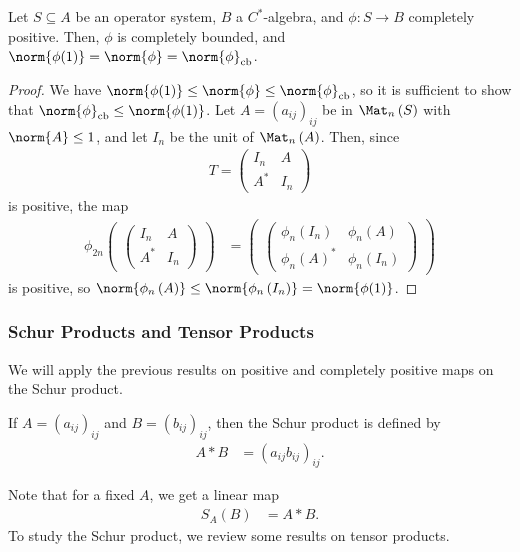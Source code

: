 \documentclass[10pt]{mypackage}
\DeclareMathOperator{\cb}{cb}
\begin{document}
\begin{proposition}
  Let $S\subseteq A$ be an operator system, $B$ a $C^{\ast}$-algebra, and $\phi\colon S\rightarrow B$ completely positive. Then, $\phi$ is completely bounded, and $\norm{\phi(1)} = \norm{\phi} = \norm{\phi}_{\cb}$.
\end{proposition}
\begin{proof}
  We have $\norm{\phi(1)}\leq \norm{\phi}\leq \norm{\phi}_{\cb}$, so it is sufficient to show that $\norm{\phi}_{\cb}\leq \norm{\phi(1)}$. Let $A = \left( a_{ij} \right)_{ij}$ be in $\Mat_n\left( S \right)$ with $\norm{A} \leq 1$, and let $I_n$ be the unit of $\Mat_n\left( A \right)$. Then, since
  \begin{align*}
    T = \begin{pmatrix}I_n & A \\ A^{\ast} & I_n\end{pmatrix}
  \end{align*}
  is positive, the map
  \begin{align*}
    \phi_{2n} \begin{pmatrix}\begin{pmatrix}I_n & A \\ A^{\ast} & I_n\end{pmatrix}\end{pmatrix}  &= \begin{pmatrix} \begin{pmatrix}\phi_n\left( I_n \right) & \phi_n\left( A \right) \\ \phi_n\left( A \right)^{\ast} & \phi_n\left( I_n \right)\end{pmatrix} \end{pmatrix}
  \end{align*}
  is positive, so $\norm{\phi_n\left( A \right)} \leq \norm{\phi_n\left( I_n \right)} = \norm{\phi(1)}$.
\end{proof}
\subsubsection{Schur Products and Tensor Products}%
We will apply the previous results on positive and completely positive maps on the Schur product.
\begin{definition}
  If $A = \left( a_{ij} \right)_{ij}$ and $B = \left( b_{ij} \right)_{ij}$, then the Schur product is defined by
  \begin{align*}
    A\ast B &= \left( a_{ij}b_{ij} \right)_{ij}.
  \end{align*}
\end{definition}
Note that for a fixed $A$, we get a linear map
\begin{align*}
  S_A\left( B \right) &= A\ast B.
\end{align*}
To study the Schur product, we review some results on tensor products.\newline
\end{document}
